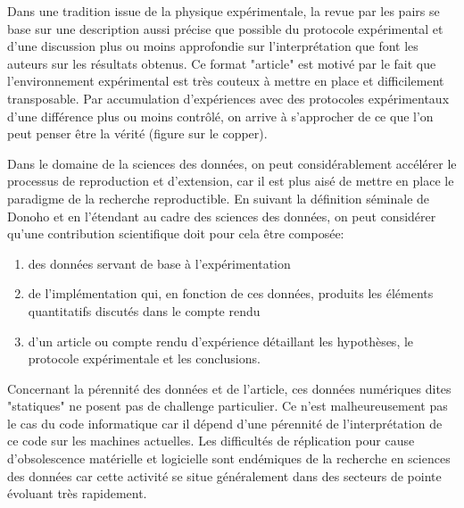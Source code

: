 Dans une tradition issue de la physique expérimentale, la revue par les pairs se base sur une description aussi précise que possible du protocole expérimental et d'une discussion plus ou moins approfondie sur l'interprétation que font les auteurs sur les résultats obtenus. Ce format "article" est motivé par le fait que l'environnement expérimental est très couteux à mettre en place et difficilement transposable. Par accumulation d'expériences avec des protocoles expérimentaux d'une différence plus ou moins contrôlé, on arrive à s'approcher de ce que l'on peut penser être la vérité (figure sur le copper).

Dans le domaine de la sciences des données, on peut considérablement accélérer le processus de reproduction et d'extension, car il est plus aisé de mettre en place le paradigme de la recherche reproductible. En suivant la définition séminale de Donoho et en l'étendant au cadre des sciences des données, on peut considérer qu'une contribution scientifique doit pour cela être composée:
\begin{enumerate}
  \item des données servant de base à l'expérimentation
  \item de l'implémentation qui, en fonction de ces données, produits les éléments quantitatifs discutés dans le compte rendu
  \item d'un article ou compte rendu d'expérience détaillant les hypothèses, le protocole expérimentale et les conclusions.
\end{enumerate}

Concernant la pérennité des données et de l'article, ces données numériques dites "statiques" ne posent pas de challenge particulier. Ce n'est malheureusement pas le cas du code informatique car il dépend d'une pérennité de l'interprétation de ce code sur les machines actuelles. Les difficultés de réplication pour cause d'obsolescence matérielle et logicielle sont endémiques de la recherche en sciences des données car cette activité se situe généralement dans des secteurs de pointe évoluant très rapidement.

